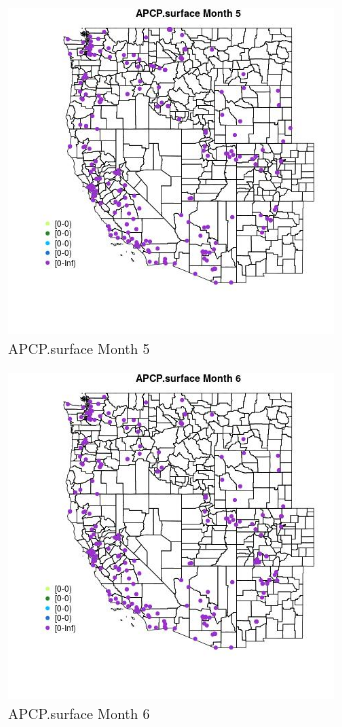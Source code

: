 \begin{figure} 
\centering  
\includegraphics[width=0.77\textwidth]{Code_Outputs/Report_ML_input_PM25_Step4_part_e_de_duplicated_aveswNAs_MapObsMo5APCPsurface.jpg} 
\caption{\label{fig:Report_ML_input_PM25_Step4_part_e_de_duplicated_aveswNAsMapObsMo5APCPsurface}APCP.surface Month 5} 
\end{figure} 
 

\clearpage 

\begin{figure} 
\centering  
\includegraphics[width=0.77\textwidth]{Code_Outputs/Report_ML_input_PM25_Step4_part_e_de_duplicated_aveswNAs_MapObsMo6APCPsurface.jpg} 
\caption{\label{fig:Report_ML_input_PM25_Step4_part_e_de_duplicated_aveswNAsMapObsMo6APCPsurface}APCP.surface Month 6} 
\end{figure} 
 

